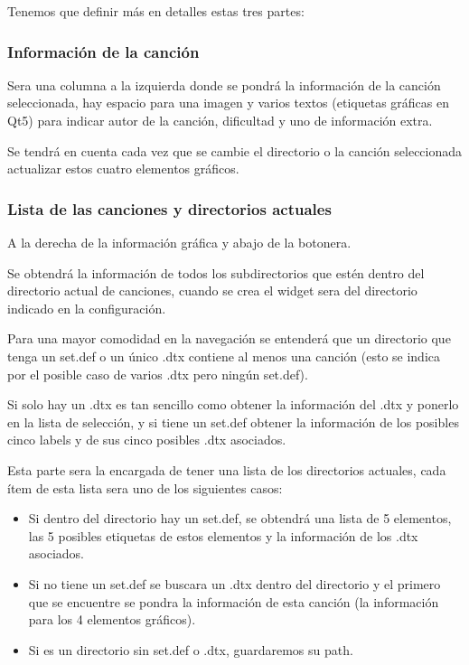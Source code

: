 \documentclass[a4paper,11pt,oneside]{book}
\begin{document}
Tenemos que definir más en detalles estas tres partes:

\subsubsection{Información de la canción}
Sera una columna a la izquierda donde se pondrá la información de la canción seleccionada, hay espacio para una imagen y varios textos (etiquetas gráficas en Qt5) para indicar autor de la canción, dificultad y uno de información extra.

Se tendrá en cuenta cada vez que se cambie el directorio o la canción seleccionada actualizar estos cuatro elementos gráficos.

\subsubsection{Lista de las canciones y directorios actuales}
A la derecha de la información gráfica y abajo de la botonera.

Se obtendrá la información de todos los subdirectorios que estén dentro del directorio actual de canciones, cuando se crea el widget sera del directorio indicado en la configuración.

Para una mayor comodidad en la navegación se entenderá que un directorio que tenga un set.def o un único .dtx contiene al menos una canción (esto se indica por el posible caso de varios .dtx pero ningún set.def).

Si solo hay un .dtx es tan sencillo como obtener la información del .dtx y ponerlo en la lista de selección, y si tiene un set.def obtener la información de los posibles cinco labels y de sus cinco posibles .dtx asociados.

Esta parte sera la encargada de tener una lista de los directorios actuales, cada ítem de esta lista sera uno de los siguientes casos:

\begin{itemize}
   \item Si dentro del directorio hay un set.def, se obtendrá una lista de 5 elementos, las 5 posibles etiquetas de estos elementos y la información de los .dtx asociados.
   \item Si no tiene un set.def se buscara un .dtx dentro del directorio y el primero que se encuentre se pondra la información de esta canción (la información para los 4 elementos gráficos).
   \item Si es un directorio sin set.def o .dtx, guardaremos su path.
 \end{itemize}
 
\end{document}
